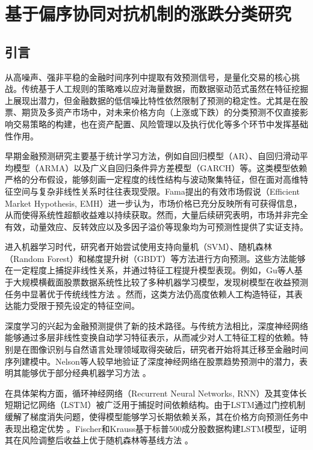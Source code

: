\chapter{基于偏序协同对抗机制的涨跌分类研究}

\section{引言}

从高噪声、强非平稳的金融时间序列中提取有效预测信号，是量化交易的核心挑战。传统基于人工规则的策略难以应对海量数据，而数据驱动范式虽然在特征挖掘上展现出潜力，但金融数据的低信噪比特性依然限制了预测的稳定性。尤其是在股票、期货及多资产市场中，对未来价格方向（上涨或下跌）的分类预测不仅直接影响交易策略的构建，也在资产配置、风险管理以及执行优化等多个环节中发挥基础性作用。

早期金融预测研究主要基于统计学习方法，例如自回归模型（AR）、自回归滑动平均模型（ARMA）以及广义自回归条件异方差模型（GARCH）等。这类模型依赖严格的分布假设，能够刻画一定程度的线性结构与波动聚集特征，但在面对高维特征空间与复杂非线性关系时往往表现受限。Fama提出的有效市场假说（Efficient Market Hypothesis, EMH）进一步认为，市场价格已充分反映所有可获得信息，从而使得系统性超额收益难以持续获取\cite{fama1970efficient}。然而，大量后续研究表明，市场并非完全有效，动量效应、反转效应以及多因子溢价等现象均为可预测性提供了实证支持\cite{jegadeesh1993returns,carhart1997persistence}。

进入机器学习时代，研究者开始尝试使用支持向量机（SVM）、随机森林（Random Forest）和梯度提升树（GBDT）等方法进行方向预测。这些方法能够在一定程度上捕捉非线性关系，并通过特征工程提升模型表现。例如，Gu等人基于大规模横截面股票数据系统性比较了多种机器学习模型，发现树模型在收益预测任务中显著优于传统线性方法 \cite{gu2020empirical}。然而，这类方法仍高度依赖人工构造特征，其表达能力受限于预先设定的特征空间。

深度学习的兴起为金融预测提供了新的技术路径。与传统方法相比，深度神经网络能够通过多层非线性变换自动学习特征表示，从而减少对人工特征工程的依赖。特别是在图像识别与自然语言处理领域取得突破后，研究者开始将其迁移至金融时间序列建模中。Nelson等人较早地验证了深度神经网络在股票趋势预测中的潜力，表明其能够优于部分经典机器学习方法 \cite{nelson2017stock}。

在具体架构方面，循环神经网络（Recurrent Neural Networks, RNN）及其变体长短期记忆网络（LSTM）被广泛用于捕捉时间依赖结构。由于LSTM通过门控机制缓解了梯度消失问题，使得模型能够学习长期依赖关系，其在价格方向预测任务中表现出稳定优势 \cite{hochreiter1997long}。Fischer和Krauss基于标普500成分股数据构建LSTM模型，证明其在风险调整后收益上优于随机森林等基线方法 \cite{fischer2018deep}。

